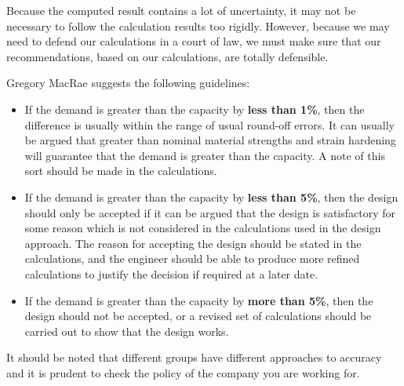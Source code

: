 Because the computed result contains a lot of uncertainty, it may not be necessary to follow the calculation results too rigidly.
However, because we may need to defend our calculations in a court of law, we must make sure that our recommendations, based on our calculations, are totally defensible.

Gregory MacRae suggests the following guidelines:
\begin{itemize}
\item If the demand is greater than the capacity by \textbf{less than 1\%}, then the difference is usually within the range of usual round-off errors.
It can usually be argued that greater than nominal material strengths and strain hardening will guarantee that the demand is greater than the capacity.
A note of this sort should be made in the calculations.
\item If the demand is greater than the capacity by \textbf{less than 5\%}, then the design should only be accepted if it can be argued that the design is satisfactory for some reason which is not considered in the calculations used in the design approach.
The reason for accepting the design should be stated in the calculations, and the engineer should be able to produce more refined calculations to justify the decision if required at a later date.
\item If the demand is greater than the capacity by \textbf{more than 5\%}, then the design should not be accepted, or a revised set of calculations should be carried out to show that the design works.
\end{itemize}
It should be noted that different groups have different approaches to accuracy and it is prudent to check the policy of the company you are working for.